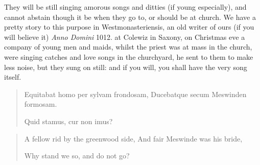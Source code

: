 They will be still singing amorous songs and ditties (if young
especially), and cannot abstain though it be when they go to, or should
be at church. We have a pretty story to this purpose in
Westmonasteriensis, an old writer of ours (if you will believe
it) \emph{Anno Domini} 1012. at Colewiz in Saxony, on Christmas eve a company
of young men and maids, whilst the priest was at mass in the church,
were singing catches and love songs in the churchyard, he sent to them
to make less noise, but they sung on still: and if you will, you shall
have the very song itself.

\begin{latin}
\begin{verse}
Equitabat homo per sylvam frondosam,
Ducebatque secum Meswinden formosam.

Quid stamus, cur non imus?
\end{verse}
\end{latin}
\translationrule%
\begin{verse}%
A fellow rid by the greenwood side,
And fair Meswinde was his bride,

Why stand we so, and do not go?
\end{verse}%


